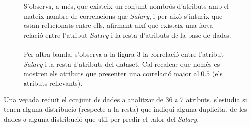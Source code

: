 \documentclass[a4paper, 11pt]{article}
\begin{document}
\begin{figure}[h]
\begin{minipage}{6.3cm}
S'observa, a més, que existeix un conjunt nombrós d'atributs amb el mateix nombre de correlacions que \textit{Salary}, i per això s'intueix que estan relacionats entre ells, afirmant així que existeix una forta relació entre l'atribut \textit{Salary} i la resta d'atributs de la base de dades.
\\\\
Per altra banda, s'observa a la
figura 3 la correlació entre
l'atribut \textit{Salary} i la resta
d'atributs del dataset.
Cal recalcar que només es mostren els
atributs que presenten una correlació
major al $0.5$ (els atributs rellevants).
\end{minipage} %
\end{figure} %
\newpage
\hspace{-1.7 em}Una vegada reduït el conjunt de dades a analitzar de 36 a 7 atributs, s'estudia si tenen alguna distribució (respecte a la resta) que indiqui alguna duplicitat de les dades o alguna distribució que útil per predir el valor del \textit{Salary}.
\end{document}
